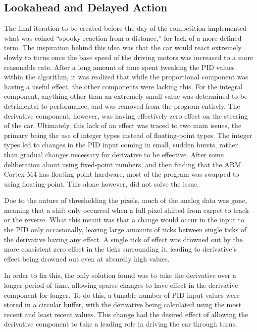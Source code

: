 \documentclass[conference]{IEEEtran}
\begin{document}
\subsection{Lookahead and Delayed Action}
    The final iteration to be created before the day of the competition implemented what was coined ``spooky reaction from a distance,'' for lack of a more
    defined term. 
    The inspiration behind this idea was that the car would react extremely slowly to turns once the base speed of the driving motors was increased to
    a more reasonable rate.
    After a long amount of time spent tweaking the PID values within the algorithm, it was realized that while the proportional component was having a
    useful effect, the other components were lacking this. For the integral component, anything other than an extremely small value was determined to
    be detrimental to performance, and was removed from the program entirely. The derivative component, however, was having effectively zero effect
    on the steering of the car.
    Ultimately, this lack of an effect was traced to two main issues, the primary being the use of integer types instead of floating-point types.
    The integer types led to changes in the PID input coming in small, sudden bursts, rather than gradual changes necessary for derivative to be effective.
    After some deliberation about using fixed-point numbers, and then finding that the ARM Cortex-M4 has floating point hardware, most of the
    program was swapped to using floating-point. This alone however, did not solve the issue.

    Due to the nature of thresholding the pixels, much of the analog data was gone, meaning that a shift only occurred when a full pixel shifted from
    carpet to track or the reverse. What this meant was that a change would occur in the input to the PID only occasionally, leaving large amounts
    of ticks between single ticks of the derivative having any effect. A single tick of effect was drowned out by the more consistent zero effect
    in the ticks surrounding it, leading to derivative's effect being drowned out even at absurdly high values.

    In order to fix this, the only solution found was to take the derivative over a longer period of time, allowing sparse changes to have effect in the
    derivative component for longer. To do this, a tunable number of PID input values were stored in a circular buffer, with the derivative being
    calculated using the most recent and least recent values.
    This change had the desired effect of allowing the derivative component to take a leading role in driving the car through turns.
\end{document}
